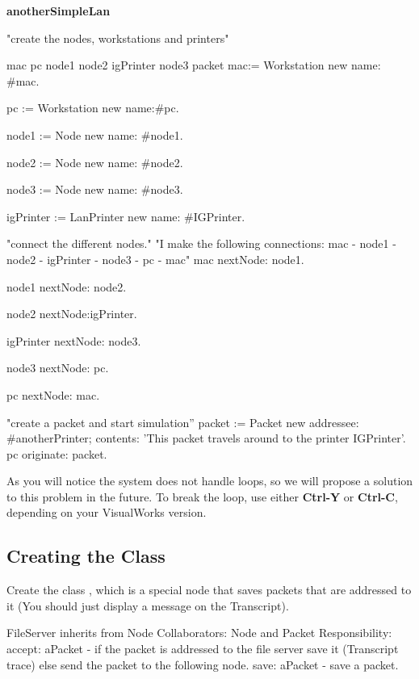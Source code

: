\begin{code}
\textbf{anotherSimpleLan}

"create the nodes, workstations and printers"

{\textbar}mac pc node1 node2 igPrinter node3 packet {\textbar}
mac:= Workstation new name: \#mac.

pc := Workstation new name:\#pc.

node1 := Node new name: \#node1.

node2 := Node new name: \#node2.

node3 := Node new name: \#node3.

igPrinter := LanPrinter new name: \#IGPrinter.

"connect the different nodes." "I make the following connections:
\tab \tab mac -\ct{>} node1 -\ct{>} node2 -\ct{>} \tab
\tab igPrinter -\ct{>} node3 -\ct{>} pc -\ct{>} mac"
mac nextNode: node1.

node1 nextNode: node2.

node2 nextNode:igPrinter.

igPrinter nextNode: node3.

node3 nextNode: pc.

pc nextNode: mac.

"create a packet and start simulation''
packet := Packet new
             addressee: \#anotherPrinter;
             contents: 'This packet travels around
             to the printer IGPrinter'.
pc originate: packet.
\end{code}


As you will notice the system does not handle loops, so we will
propose a solution to this problem in the future. To break the
loop, use either \textbf{Ctrl-Y} or \textbf{Ctrl-C}, depending on your VisualWorks version.

\subsection*{Creating the Class }

Create the class , which is a special node that
saves packets that are addressed to it (You should just display a
message on the Transcript).


\begin{code}
FileServer inherits from Node
Collaborators: Node and Packet
Responsibility:
accept: aPacket - if the packet is addressed to the
file server save it (Transcript trace) else send the
packet to the following node.
save: aPacket - save a packet.
\end{code}

\ifx\wholebook\relax\else\fi
